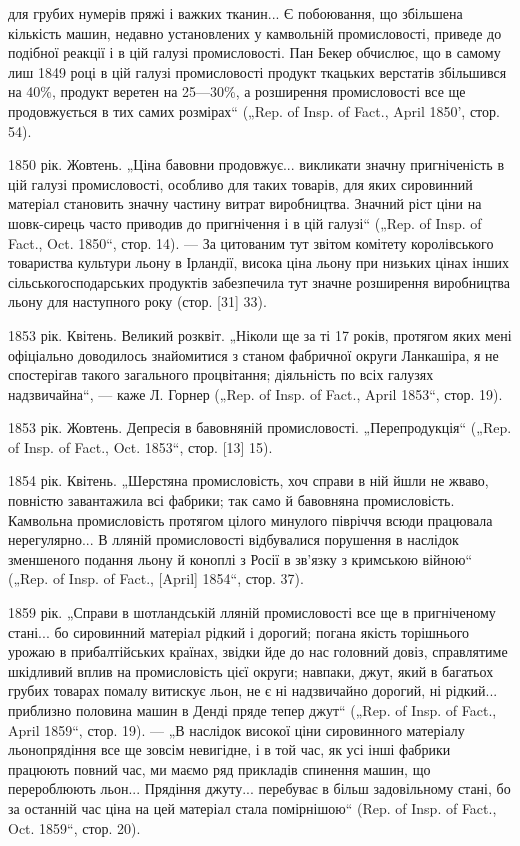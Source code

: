 \parcont{}  %
для грубих нумерів пряжі і важких тканин... Є побоювання, що
збільшена кількість машин, недавно установлених у камвольній
промисловості, приведе до подібної реакції і в цій галузі промисловості.
Пан Бекер обчислює, що в самому лиш 1849 році в цій
галузі промисловості продукт ткацьких верстатів збільшився на
40\%, продукт веретен на 25—30\%, а розширення промисловості
все ще продовжується в тих самих розмірах“ („Rep. of Insp.
of Fact., April 1850', стор. 54).

1850 рік. Жовтень. „Ціна бавовни продовжує... викликати
значну пригніченість в цій галузі промисловості, особливо для
таких товарів, для яких сировинний матеріал становить значну
частину витрат виробництва. Значний ріст ціни на шовк-сирець
часто приводив до пригнічення і в цій галузі“ („Rep. of Insp. of
Fact., Oct. 1850“, стор. 14). — За цитованим тут звітом комітету
королівського товариства культури льону в Ірландії, висока
ціна льону при низьких цінах інших сільськогосподарських продуктів
забезпечила тут значне розширення виробництва льону
для наступного року (стор. [31] 33).

1853 рік. Квітень. Великий розквіт. „Ніколи ще за ті 17 років,
протягом яких мені офіціально доводилось знайомитися з станом
фабричної округи Ланкашіра, я не спостерігав такого загального
процвітання; діяльність по всіх галузях надзвичайна“, —
каже Л. Горнер („Rep. of Insp. of Fact., April 1853“, стор. 19).

1853 рік. Жовтень. Депресія в бавовняній промисловості.
„Перепродукція“ („Rep. of Insp. of Fact., Oct. 1853“, стор. [13] 15).

1854 рік. Квітень. „Шерстяна промисловість, хоч справи в ній
йшли не жваво, повністю завантажила всі фабрики; так само
й бавовняна промисловість. Камвольна промисловість протягом
цілого минулого півріччя всюди працювала нерегулярно... В лляній
промисловості відбувалися порушення в наслідок зменшеного
подання льону й коноплі з Росії в зв’язку з кримською війною“
(„Rep. of Insp. of Fact., [April] 1854“, стор. 37).

1859 рік. „Справи в шотландській лляній промисловості все
ще в пригніченому стані... бо сировинний матеріал рідкий і дорогий;
погана якість торішнього урожаю в прибалтійських країнах,
звідки йде до нас головний довіз, справлятиме шкідливий вплив
на промисловість цієї округи; навпаки, джут, який в багатьох
грубих товарах помалу витискує льон, не є ні надзвичайно дорогий,
ні рідкий... приблизно половина машин в Денді пряде
тепер джут“ („Rep. of Insp. of Fact., April 1859“, стор. 19). —
„В наслідок високої ціни сировинного матеріалу льонопрядіння
все ще зовсім невигідне, і в той час, як усі інші фабрики працюють
повний час, ми маємо ряд прикладів спинення машин,
що перероблюють льон... Прядіння джуту... перебуває в більш
задовільному стані, бо за останній час ціна на цей матеріал
стала помірнішою“ (Rep. of Insp. of Fact., Oct. 1859“, стор. 20).
